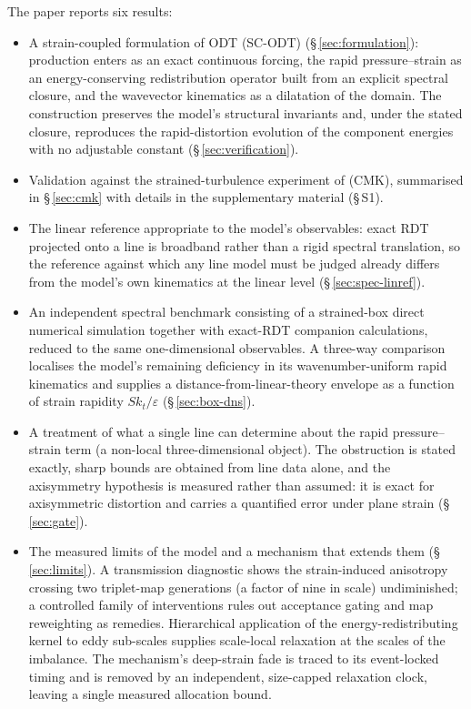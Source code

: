 \documentclass[lineno]{JFM-FLM_Au}
\begin{document}
The paper reports six results:
\begin{itemize}
\item A strain-coupled formulation of ODT (SC-ODT)
(\S\,\ref{sec:formulation}): production enters as an exact continuous
forcing, the rapid pressure--strain as an energy-conserving redistribution
operator built from an explicit spectral closure, and the wavevector
kinematics as a dilatation of the domain. The construction preserves the
model's structural invariants and, under the stated closure, reproduces
the rapid-distortion evolution of the component energies with no adjustable
constant (\S\,\ref{sec:verification}).

\item Validation against the strained-turbulence experiment of
\citet{ChenMeneveauKatz2006} (CMK), summarised in \S\,\ref{sec:cmk}
with details in the supplementary material (\S\,S1).

\item The linear reference appropriate to the model's observables: exact
RDT projected onto a line is broadband rather than a rigid spectral
translation, so the reference against which any line model must be judged
already differs from the model's own kinematics at the linear level
(\S\,\ref{sec:spec-linref}).

\item An independent spectral benchmark consisting of a strained-box direct
numerical simulation together with exact-RDT companion calculations,
reduced to the same one-dimensional observables. A three-way comparison
localises the model's remaining deficiency in its wavenumber-uniform rapid
kinematics and supplies a distance-from-linear-theory envelope as a
function of strain rapidity $Sk_t/\varepsilon$ (\S\,\ref{sec:box-dns}).

\item A treatment of what a single line can determine about the rapid
pressure--strain term (a non-local three-dimensional object). The
obstruction is stated exactly, sharp bounds are obtained from line data
alone, and the axisymmetry hypothesis is measured rather than assumed: it
is exact for axisymmetric distortion and carries a quantified error under
plane strain (\S\,\ref{sec:gate}).

\item The measured limits of the model and a mechanism that extends them
(\S\,\ref{sec:limits}). A transmission diagnostic shows the strain-induced
anisotropy crossing two triplet-map generations (a factor of nine in
scale) undiminished; a controlled family of interventions rules out
acceptance gating and map reweighting as remedies. Hierarchical application
of the energy-redistributing kernel to eddy sub-scales supplies scale-local
relaxation at the scales of the imbalance. The mechanism's deep-strain fade
is traced to its event-locked timing and is removed by an independent,
size-capped relaxation clock, leaving a single measured allocation bound.


\end{itemize}
\end{document}
